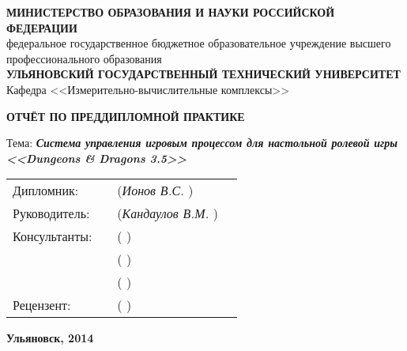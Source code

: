 \begin{titlepage}

\sffamily


\small
\begin{center}

\MakeTextUppercase{\textbf{министерство образования и науки российской федерации}}\\
федеральное государственное бюджетное образовательное учреждение высшего профессионального образования\\
\MakeTextUppercase{\textbf{ульяновский государственный технический университет}}\\[0.7cm]

Кафедра <<Измерительно-вычислительные комплексы>>\\[0.7cm]

\vspace{1.5cm}

\LARGE

\textbf{ОТЧЁТ ПО ПРЕДДИПЛОМНОЙ ПРАКТИКЕ}

\vspace{1.5cm}

\normalsize

Тема: \textbf{\textit{\emph{Система управления игровым процессом для настольной ролевой игры <<Dungeons \& Dragons 3.5>>}}}

\vspace{2cm}

\begin{tabular}{l m{6cm} m{5cm} l}
    Дипломник:    & \emph{\hfill} & (\emph{Ионов В.С.\hfill}     )  & \\[0.5cm]
    Руководитель: & \emph{\hfill} & (\emph{Кандаулов В.М.\hfill} )  & \\[0.5cm]
    Консультанты: & \emph{\hfill} & (\emph{\hfill}               )  & \\[0.5cm]
                  & \emph{\hfill} & (\emph{\hfill}               )  & \\[0.5cm]
                  & \emph{\hfill} & (\emph{\hfill}               )  & \\[0.5cm]
    Рецензент:    & \emph{\hfill} & (\emph{\hfill}               )  & \\
\end{tabular}

\vfill

\textbf{Ульяновск, 2014}

\end{center}

\end{titlepage}

\restoregeometry
